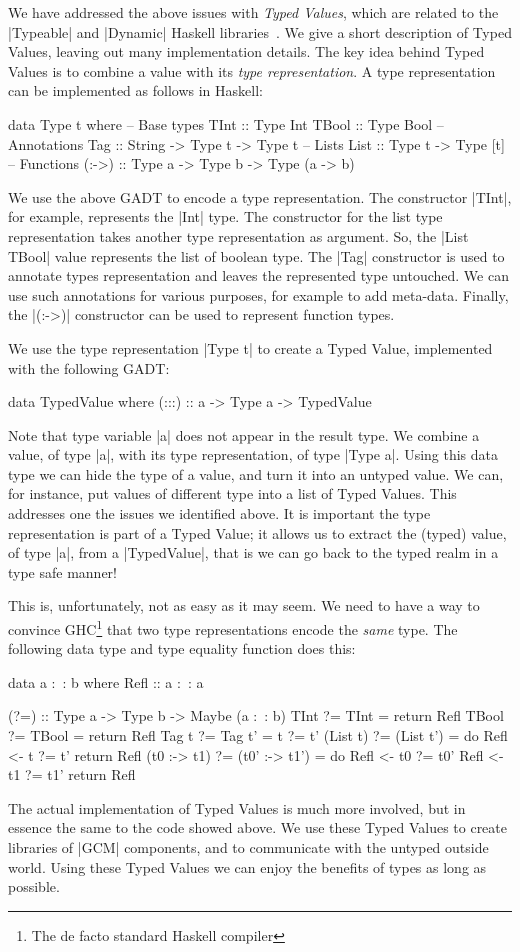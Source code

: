 \documentclass{article}
\begin{document}
We have addressed the above issues with \emph{Typed Values}, which are related
to the |Typeable| and |Dynamic| Haskell libraries~\cite{DataDynamic}. We give a
short description of Typed Values, leaving out many implementation details. The
key idea behind Typed Values is to combine a value with its \emph{type
representation}. A type representation can be implemented as follows in Haskell:
\begin{haskellcode}
data Type t where
  -- Base types
  TInt   :: Type Int
  TBool  :: Type Bool
  -- Annotations
  Tag   :: String -> Type t -> Type t
  -- Lists
  List  :: Type t -> Type [t]
  -- Functions
  (:->) :: Type a -> Type b -> Type (a -> b)
\end{haskellcode}
We use the above GADT to encode a type representation. The constructor |TInt|,
for example, represents the |Int| type. The constructor for the list type
representation takes another type representation as argument. So, the |List TBool| 
value represents the list of boolean type. The |Tag| constructor is used
to annotate types representation and leaves the represented type untouched. We
can use such annotations for various purposes, for example to add meta-data.
Finally, the |(:->)| constructor can be used to represent function types. 

We use the type representation |Type t| to create a Typed Value, implemented
with the following GADT:
\begin{haskellcode}
data TypedValue where
  (:::) :: a -> Type a -> TypedValue
\end{haskellcode}
Note that type variable |a| does not appear in the result type. We combine a
value, of type |a|, with its type representation, of type |Type a|. Using this
data type we can hide the type of a value, and turn it into an untyped value. 
We can, for instance, put values of different type into a list of Typed Values.
This addresses one the issues we identified above. It is important the type 
representation is part of a Typed Value; it allows us to extract the (typed)
value, of type |a|, from a |TypedValue|, that is we can go back to the typed 
realm in a type safe manner! 

This is, unfortunately, not as easy as it may seem. We need to have a way to
convince GHC\footnote{The de facto standard Haskell compiler} that two 
type representations encode the \emph{same} type. The following data type and
type equality function does this:
\begin{haskellcode}
data a :~: b where
  Refl :: a :~: a

(?=) :: Type a -> Type b -> Maybe (a :~: b)
TInt         ?= TInt       = return Refl
TBool        ?= TBool      = return Refl
Tag t        ?= Tag t'     = t ?= t'
(List t)     ?= (List t')  = do
  Refl <- t  ?= t'
  return Refl
(t0 :-> t1)  ?= (t0' :-> t1') = do
  Refl <- t0 ?= t0'
  Refl <- t1 ?= t1'
  return Refl
\end{haskellcode}
The actual implementation of Typed Values is much more involved, but in essence
the same to the code showed above. We use these Typed Values to create libraries
of |GCM| components, and to communicate with the untyped outside world. Using
these Typed Values we can enjoy the benefits of types as long as possible. 
\end{document}
